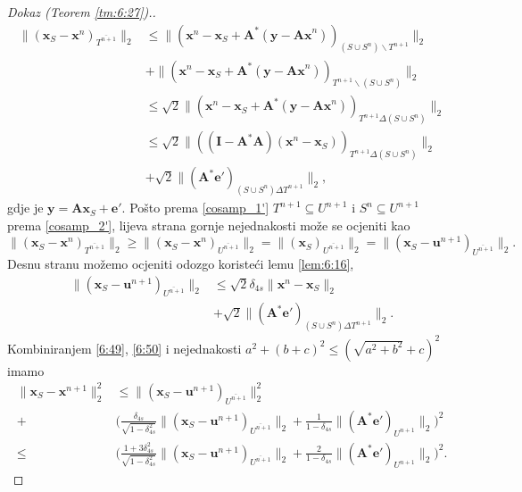 \documentclass[a4paper,twoside,12pt]{memoir} %
\newcommand{\vect}[1]{\mathbf{#1}}
\renewcommand{\vec}{\vect}
\newcommand{\norm}[1]{\|{#1}\|}
\begin{document}
\begin{proof}[Dokaz (Teorem \ref{tm:6:27}).]
\begin{align*}
        \norm{(\vec x_S - \vec x^n)_{\overline{T^{n+1}}}}_2 & \leq \norm{(\vec x^n - \vec x_S + \vec A^*(\vec y - \vec{Ax}^n))_{(S \cup S^n) \backslash T^{n+1}}}_2\\[0.5em]
        & + \norm{(\vec x^n - \vec x_S + \vec A^*(\vec y - \vec{Ax}^n))_{T^{n+1} \backslash (S \cup S^n)}}_2\\[0.5em]
        & \leq \sqrt{2} \norm{(\vec x^n - \vec x_S + \vec A^*(\vec y - \vec{Ax}^n))_{T^{n+1} \Delta (S \cup S^n)}}_2\\[0.5em]
        & \leq \sqrt{2} \norm{((\vec I - \vec A^* \vec A)(\vec x^n - \vec x_S))_{T^{n+1} \Delta (S \cup S^n)}}_2\\[0.5em]
        & + \sqrt{2} \norm{(\vec A^* \vec e')_{(S \cup S^n) \Delta T^{n+1}}}_2,
    \end{align*}
    gdje je $\vec y = \vec{Ax}_S + \vec e'$. Po\v{s}to prema \eqref{cosamp_1'} $T^{n+1} \subseteq U^{n+1}$ i $S^n \subseteq U^{n+1}$ prema \eqref{cosamp_2'}, lijeva strana gornje nejednakosti mo\v{z}e se ocjeniti kao
    \begin{equation*}
        \norm{(\vec x_S - \vec x^n)_{\overline{T^{n+1}}}}_2 \geq \norm{(\vec x_S - \vec x^n)_{\overline{U^{n+1}}}}_2 = \norm{(\vec x_S)_{\overline{U^{n+1}}}}_2 = \norm{(\vec x_S - \vec u^{n+1})_{\overline{U^{n+1}}}}_2.
    \end{equation*}
    Desnu stranu mo\v{z}emo ocjeniti odozgo koriste\'ci lemu \ref{lem:6:16},
    \begin{align}
        \norm{(\vec x_S - \vec u^{n+1})_{\overline{U^{n+1}}}}_2 & \leq \sqrt{2} \delta_{4s} \norm{\vec x^n - \vec x_S}_2 \nonumber \\[0.5em]
            & + \sqrt{2}\norm{(\vec A^*\vec e')_{(S \cup S^n) \Delta T^{n+1}}}_2.\label{6:51}
    \end{align}
    Kombiniranjem \eqref{6:49}, \eqref{6:50} i nejednakosti $a^2 + (b+c)^2 \leq (\sqrt{a^2 + b^2} + c)^2$ imamo
    \begin{align*}
        \norm{\vec x_S - \vec x^{n+1}}_2^2 & \leq \norm{(\vec x_S - \vec u^{n+1})_{\overline{U^{n+1}}}}_2^2\\[0.5em]
        + & \bigg( \frac{\delta_{4s}}{\sqrt{1-\delta_{4s}^2}}\norm{(\vec x_S - \vec u^{n+1})_{\overline{U^{n+1}}}}_2 + \frac{1}{1-\delta_{4s}} \norm{(\vec A^* \vec e')_{U^{n+1}}}_2   \bigg)^2\\[0.5em]
        \leq & \bigg( \frac{1+3 \delta_{4s}^2}{\sqrt{1-\delta_{4s}^2}}\norm{(\vec x_S - \vec u^{n+1})_{\overline{U^{n+1}}}}_2 + \frac{2}{1-\delta_{4s}} \norm{(\vec A^* \vec e')_{U^{n+1}}}_2   \bigg)^2.

\end{align*}
\end{proof}
\end{document}
